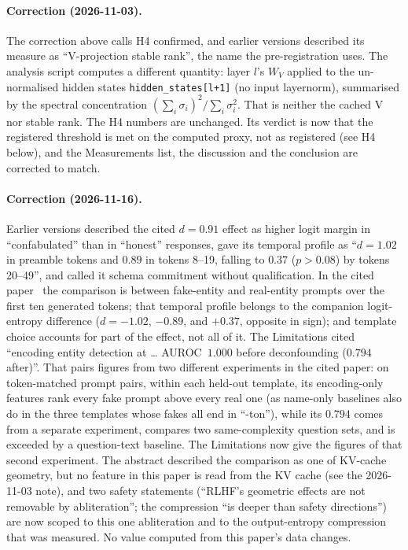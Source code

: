 \documentclass[11pt,a4paper]{article}
\begin{document}
\paragraph{Correction (2026-11-03).}
The correction above calls H4 confirmed, and earlier versions
described its measure as ``V-projection stable rank'', the name the
pre-registration uses. The analysis script computes a different
quantity: layer $l$'s $W_V$ applied to the un-normalised hidden states
\texttt{hidden\_states[l+1]} (no input layernorm), summarised by the
spectral concentration $(\sum_i \sigma_i)^2 / \sum_i \sigma_i^2$. That
is neither the cached V nor stable rank. The H4 numbers are unchanged.
Its verdict is now that the registered threshold is met on the
computed proxy, not as registered (see H4 below), and the Measurements
list, the discussion and the conclusion are corrected to match.

\paragraph{Correction (2026-11-16).}
Earlier versions described the cited $d{=}0.91$ effect as higher logit
margin in ``confabulated'' than in ``honest'' responses, gave its
temporal profile as ``$d{=}1.02$ in preamble tokens and $0.89$ in
tokens 8--19, falling to $0.37$ ($p{>}0.08$) by tokens 20--49'', and
called it schema commitment without qualification. In the cited
paper~\citep{lyra2026decision} the comparison is between fake-entity
and real-entity prompts over the first ten generated tokens; that
temporal profile belongs to the companion logit-entropy difference
($d{=}{-}1.02$, $-0.89$, and $+0.37$, opposite in sign); and template
choice accounts for part of the effect, not all of it. The Limitations
cited ``encoding entity detection at \ldots{} AUROC~$1.000$ before
deconfounding ($0.794$ after)''. That pairs figures from two different
experiments in the cited paper: on token-matched prompt pairs, within
each held-out template, its encoding-only features rank every fake
prompt above every real one (as name-only baselines also do in the
three templates whose fakes all end in ``-ton''), while its $0.794$ comes from a separate
experiment, compares two same-complexity question sets, and is exceeded
by a question-text baseline. The Limitations now give the figures of
that second experiment. The
abstract described the comparison as one of KV-cache geometry, but no
feature in this paper is read from the KV cache (see the 2026-11-03
note), and two safety statements (``RLHF's geometric effects are not
removable by abliteration''; the compression ``is deeper than safety
directions'') are now scoped to this one abliteration and to the
output-entropy compression that was measured. No value computed from
this paper's data changes.
\end{document}
